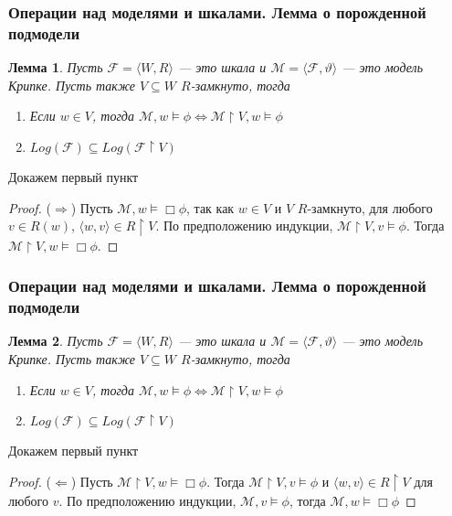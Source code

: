 \documentclass[pdf,utf8,russian,aspectratio=169]{beamer}
\newtheorem{lem}{Лемма}
\begin{document}
\begin{frame}
  \frametitle{Операции над моделями и шкалами. Лемма о порожденной подмодели}

\begin{lem} Пусть $\mathcal{F} = \langle W, R \rangle$ --- это шкала и $\mathcal{M} = \langle \mathcal{F}, \vartheta \rangle$
  --- это модель Крипке. Пусть также $V \subseteq W$ $R$-замкнуто, тогда
  \begin{enumerate}
    \item Если $w \in V$, тогда $\mathcal{M}, w \models \phi \Leftrightarrow \mathcal{M} \upharpoonright V, w \models \phi $
    \item $Log(\mathcal{F}) \subseteq Log(\mathcal{F} \upharpoonright V)$
  \end{enumerate}
\end{lem}

Докажем первый пункт

\begin{proof}
  ($\Rightarrow$) Пусть $\mathcal{M}, w \models \Box \phi$, так как $w \in V$ и $V$ $R$-замкнуто, для любого $v \in R(w)$,
  $\langle w, v \rangle \in R \upharpoonright V$. По предположению индукции, $\mathcal{M} \upharpoonright V, v \models \phi$.
  Тогда $\mathcal{M} \upharpoonright V, w \models \Box \phi$.
\end{proof}
\end{frame}

\begin{frame}
  \frametitle{Операции над моделями и шкалами. Лемма о порожденной подмодели}

\begin{lem} Пусть $\mathcal{F} = \langle W, R \rangle$ --- это шкала и $\mathcal{M} = \langle \mathcal{F}, \vartheta \rangle$
  --- это модель Крипке. Пусть также $V \subseteq W$ $R$-замкнуто, тогда
  \begin{enumerate}
    \item Если $w \in V$, тогда $\mathcal{M}, w \models \phi \Leftrightarrow \mathcal{M} \upharpoonright V, w \models \phi $
    \item $Log(\mathcal{F}) \subseteq Log(\mathcal{F} \upharpoonright V)$
  \end{enumerate}
\end{lem}

Докажем первый пункт

\begin{proof}
  ($\Leftarrow$) Пусть $\mathcal{M} \upharpoonright V, w \models \Box \phi$.
  Тогда $\mathcal{M} \upharpoonright V, v \models \phi$ и $\langle w, v \rangle \in R \upharpoonright V$ для любого $v$.
  По предположению индукции, $\mathcal{M}, v \models \phi$, тогда $\mathcal{M}, w \models \Box \phi$
\end{proof}
\end{frame}
\end{document}
